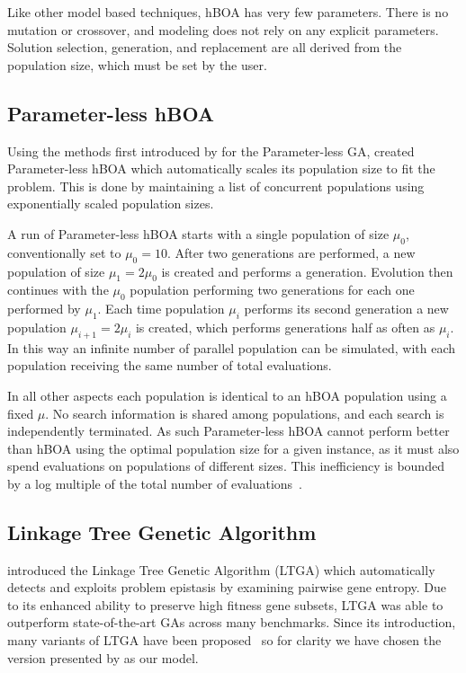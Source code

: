 \documentclass[twoside]{article}
\begin{document}
Like other model based techniques, hBOA has very few parameters. There is no mutation or crossover,
and modeling does not rely on any explicit parameters. Solution selection, generation, and replacement
are all derived from the population size, which must be set by the user.

\subsection{Parameter-less hBOA}
Using the methods first introduced by \cite{harik:1999:parameterlessga} for the Parameter-less GA,
\cite{pelikan:2004:parameterlesshboa} created Parameter-less hBOA which automatically scales its
population size to fit the problem. This is done by maintaining a list of concurrent populations
using exponentially scaled population sizes.

A run of Parameter-less hBOA starts with a single population of size $\mu_0$, conventionally set
to $\mu_0=10$. After two generations are performed, a new population of size $\mu_1 = 2\mu_0$ is created
and performs a generation. Evolution then continues with the $\mu_0$ population performing two generations
for each one performed by $\mu_1$. Each time population $\mu_i$ performs its second generation a new population
$\mu_{i+1}=2\mu_i$ is created, which performs generations half as often as $\mu_i$. In this way an infinite number of
parallel population can be simulated, with each population receiving the same number of total evaluations.

In all other aspects each population is identical to an hBOA population using a fixed $\mu$. No search information
is shared among populations, and each search is independently terminated. As such Parameter-less hBOA cannot
perform better than hBOA using the optimal population size for a given instance, as it must also spend evaluations
on populations of different sizes. This inefficiency is bounded by a log multiple of the total number of
evaluations~\citep{pelikan:1999:worstparameter-less}.

\subsection{Linkage Tree Genetic Algorithm}
\cite{thierens:2010:ltga} introduced the Linkage Tree Genetic Algorithm (LTGA) which automatically
detects and exploits problem epistasis by examining pairwise gene entropy. Due to its enhanced
ability to preserve high fitness gene subsets, LTGA was able to outperform state-of-the-art
GAs across many benchmarks. Since its introduction, many variants of LTGA have been
proposed~\citep{goldman:2012:ltga} so for clarity we have chosen the version
presented by \cite{thierens:2013:ltgahiff} as our model.
\end{document}
